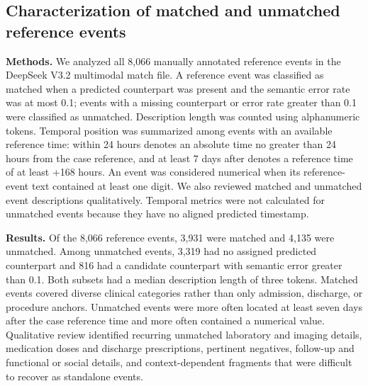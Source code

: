 \FloatBarrier
\subsection{Characterization of matched and unmatched reference events}\label{ch08:supp:matched-unmatched}

\noindent
\textbf{Methods.} We analyzed all 8,066 manually annotated reference events in the DeepSeek V3.2 multimodal match file. A reference event was classified as matched when a predicted counterpart was present and the semantic error rate was at most 0.1; events with a missing counterpart or error rate greater than 0.1 were classified as unmatched. Description length was counted using alphanumeric tokens. Temporal position was summarized among events with an available reference time: within 24 hours denotes an absolute time no greater than 24 hours from the case reference, and at least 7 days after denotes a reference time of at least +168 hours. An event was considered numerical when its reference-event text contained at least one digit. We also reviewed matched and unmatched event descriptions qualitatively. Temporal metrics were not calculated for unmatched events because they have no aligned predicted timestamp.


\noindent
\textbf{Results.} Of the 8,066 reference events, 3,931 were matched and 4,135 were unmatched. Among unmatched events, 3,319 had no assigned predicted counterpart and 816 had a candidate counterpart with semantic error greater than 0.1. Both subsets had a median description length of three tokens. Matched events covered diverse clinical categories rather than only admission, discharge, or procedure anchors. Unmatched events were more often located at least seven days after the case reference time and more often contained a numerical value. Qualitative review identified recurring unmatched laboratory and imaging details, medication doses and discharge prescriptions, pertinent negatives, follow-up and functional or social details, and context-dependent fragments that were difficult to recover as standalone events.

\par\medskip
\noindent


\par\medskip

